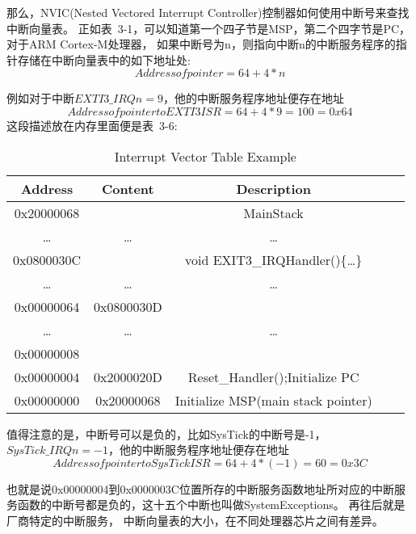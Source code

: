 那么，NVIC(Nested Vectored Interrupt Controller)控制器如何使用中断号来查找中断向量表。
正如表~3-1，可以知道第一个四子节是MSP，第二个四字节是PC，
对于ARM Cortex-M处理器，
如果中断号为n，则指向中断n的中断服务程序的指针存储在中断向量表中的如下地址处:
$$Address of pointer  = 64 + 4 * n$$

例如对于中断$EXTI3\_IRQn = 9$，他的中断服务程序地址便存在地址
$$Address of pointer to EXTI3 ISR  = 64 + 4 * 9 = 100 = 0x64$$
这段描述放在内存里面便是表~3-6:
\begin{table}[htbp]
    \caption{  Interrupt Vector Table Example }\label{tab:table1}
    \vspace{0.5em}\centering\wuhao
    \begin{tabular}{ccccc}
    \toprule[1.5pt]
    Address & Content & Description \\
    \midrule[1pt]
    0x20000068  &                & MainStack   \\
    \dots        & \dots         & \dots            \\
    0x0800030C  &                 & void EXIT3\_IRQHandler()\{\dots\}   \\
    \dots        & \dots         & \dots            \\
    0x00000064  & 0x0800030D  &                    \\
    \dots        & \dots         & \dots            \\
    0x00000008  &                &                    \\
    0x00000004  & 0x2000020D  & Reset\_Handler();Initialize PC  \\
    0x00000000  & 0x20000068  & Initialize MSP(main stack pointer)   \\  
    \bottomrule[1.5pt]
    \end{tabular}
    \vspace{\baselineskip}
    \end{table}

值得注意的是，中断号可以是负的，比如SysTick的中断号是-1，$SysTick\_IRQn = -1$，他的中断服务程序地址便存在地址
$$Address of pointer to SysTick ISR  = 64 + 4 * (-1) = 60 = 0x3C$$

也就是说0x00000004到0x0000003C位置所存的中断服务函数地址所对应的中断服务函数的中断号都是负的，这十五个中断也叫做SystemExceptions。
再往后就是厂商特定的中断服务，
中断向量表的大小，在不同处理器芯片之间有差异。

